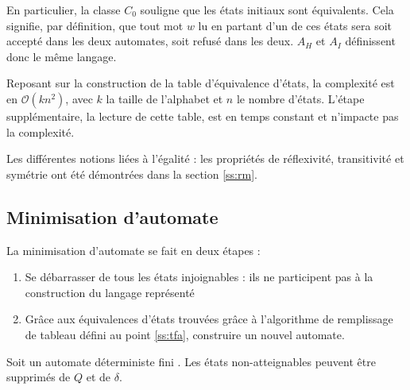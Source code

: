 	 En particulier, la classe $C_0$ souligne que les états initiaux sont équivalents. Cela signifie, par définition, que tout mot $w$ lu en partant d'un de ces états sera soit accepté dans les deux automates, soit refusé dans les deux. $A_H$ et $A_I$ définissent donc le même langage.
	 \begin{complexity}
	 	Reposant sur la construction de la table d'équivalence d'états, la complexité est en $\mathcal{O}(kn^2)$, avec $k$ la taille de l'alphabet et $n$ le nombre d'états. L'étape supplémentaire, la lecture de cette table, est en temps constant et n'impacte pas la complexité.
	 \end{complexity}
	 
	 
	 Les différentes notions liées à l'égalité : les propriétés de réflexivité, transitivité et symétrie ont été démontrées dans la section \ref{ss:rm}.
	 
	 
	 
	 \subsection{Minimisation d'automate}\label{ss:miniauto}
	 
	 La minimisation d'automate se fait en deux étapes :
	 \begin{enumerate}
	 	\item Se débarrasser de tous les états injoignables : ils ne participent pas à la construction du langage représenté
	 	\item Grâce aux équivalences d'états trouvées grâce à l'algorithme de remplissage de tableau défini au point \ref{ss:tfa}, construire un nouvel automate. 
	 \end{enumerate}
	 
	 Soit un automate déterministe fini \automaton. Les états non-atteignables peuvent être supprimés de $Q$ et de $\delta$.
	 
